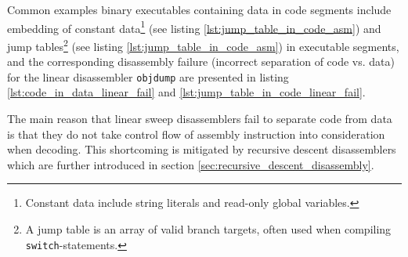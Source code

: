 Common examples binary executables containing data in code segments include embedding of constant data\footnote{Constant data include string literals and read-only global variables.} (see listing \ref{lst:jump_table_in_code_asm}) and jump tables\footnote{A jump table is an array of valid branch targets, often used when compiling \texttt{switch}-statements.} (see listing \ref{lst:jump_table_in_code_asm}) in executable segments, and the corresponding disassembly failure (incorrect separation of code vs. data) for the linear disassembler \texttt{objdump} are presented in listing \ref{lst:code_in_data_linear_fail} and \ref{lst:jump_table_in_code_linear_fail}.

The main reason that linear sweep disassemblers fail to separate code from data is that they do not take control flow of assembly instruction into consideration when decoding. This shortcoming is mitigated by recursive descent disassemblers which are further introduced in section \ref{sec:recursive_descent_disassembly}.













